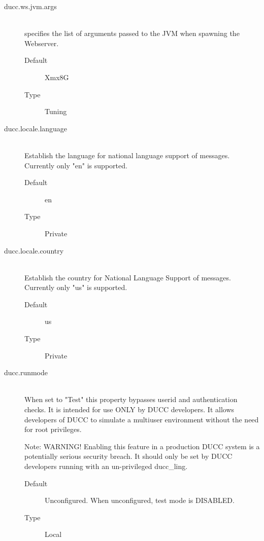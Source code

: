 \begin{description}
       \item[ducc.ws.jvm.args] \hfill \\
         specifies the list of arguments passed to the JVM when spawning the
         Webserver.
         \begin{description}
           \item[Default] Xmx8G 
           \item[Type] Tuning 
         \end{description}

       \item[ducc.locale.language] \hfill \\
         Establish the language for national language support of messages. Currently only "en" is 
         supported. 
         \begin{description}
           \item[Default] en 
           \item[Type] Private 
         \end{description}
           
       \item[ducc.locale.country] \hfill \\
         Establish the country for National Language Support of messages. Currently only "us" is 
         supported. 
         \begin{description}
           \item[Default] us 
           \item[Type] Private 
         \end{description}


       \item[ducc.runmode] \hfill \\
         When set to "Test" this property bypasses userid and authentication checks. It is intended 
         for use ONLY by DUCC developers. It allows developers of DUCC to simulate a multiuser 
         environment without the need for root privileges. 
         
         Note: WARNING! Enabling this feature in a production DUCC system is a potentially serious
         security breach. It should only be set by DUCC developers running with an un-privileged
         ducc\_ling.
         \begin{description}
           \item[Default] Unconfigured. When unconfigured, test mode is DISABLED.
           \item[Type] Local 
         \end{description}



\end{description}
